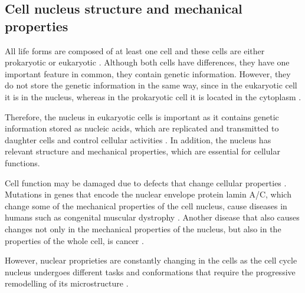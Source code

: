 \documentclass[12pt, a4paper]{article} %
\begin{document}
	\subsection{Cell nucleus structure and mechanical properties}
	
	All life forms are composed of at least one cell \cite{mazzarello1999unifying} and these cells are either prokaryotic or eukaryotic \cite{vellai1999origin}. Although both cells have differences, they have one important feature in common, they contain genetic information. However, they do not store the genetic information in the same way, since in the eukaryotic cell it is in the nucleus, whereas in the prokaryotic cell it is located in the cytoplasm \cite{cook1983mucus}.
	
	\setlength{\parskip}{4mm}
	
	Therefore, the nucleus in eukaryotic cells is important as it contains genetic information stored as nucleic acids, which are replicated and transmitted to daughter cells and control cellular activities \cite{ossareh2001protein}. In addition, the nucleus has relevant structure and mechanical properties, which are essential for cellular functions. 
	
	Cell function may be damaged due to defects that change cellular properties \cite{lammerding2011mechanics}. Mutations in genes that encode the nuclear envelope protein lamin A/C, which change some of the mechanical properties of the cell nucleus, cause diseases in humans such as congenital muscular dystrophy \cite{lammerding2004lamin}. Another disease that also causes changes not only in the mechanical properties of the nucleus, but also in the properties of the whole cell, is cancer \cite{jacobs2012introduction, lekka2019measuring, cross2007nanomechanical}.
	
	However, nuclear proprieties are constantly changing in the cells as the cell cycle nucleus undergoes different tasks and conformations that require the progressive remodelling of its microstructure \cite{liu2017mitosis}.
	
\end{document}
